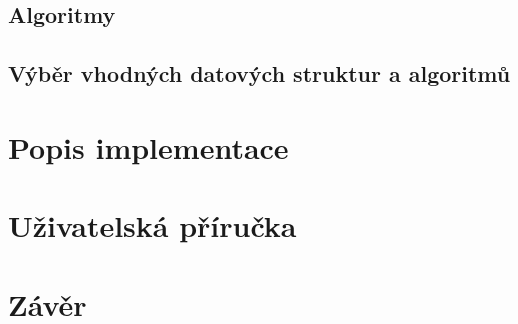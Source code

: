 \documentclass[12pt,titlepage]{article}
\begin{document}
\subsection{Algoritmy}

\subsection{Výběr vhodných datových struktur a algoritmů}

\section{Popis implementace}

\section{Uživatelská příručka}

\section{Závěr}
\end{document}
